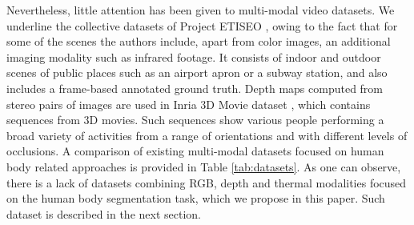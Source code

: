 \documentclass[10pt,twocolumn,letterpaper]{article}
\begin{document}
Nevertheless, little attention has been given to multi-modal video datasets. We underline the collective datasets of Project ETISEO \cite{nghiem2007etiseo}, owing to the fact that for some of the scenes the authors include, apart from color images, an additional imaging modality such as infrared footage. It consists of indoor and outdoor scenes of public places such as an airport apron or a subway station, and also includes a frame-based annotated ground truth. Depth maps computed from stereo pairs of images are used in Inria 3D Movie dataset \cite{alahari2013pose}, which contains sequences from 3D movies. Such sequences show various people performing a broad variety of activities from a range of orientations and with different levels of occlusions. A comparison of existing multi-modal datasets focused on human body related approaches is provided in Table \ref{tab:datasets}. As one can observe, there is a lack of datasets combining RGB, depth and thermal modalities focused on the human body segmentation task, which we propose in this paper. Such dataset is described in the next section.  
\end{document}
